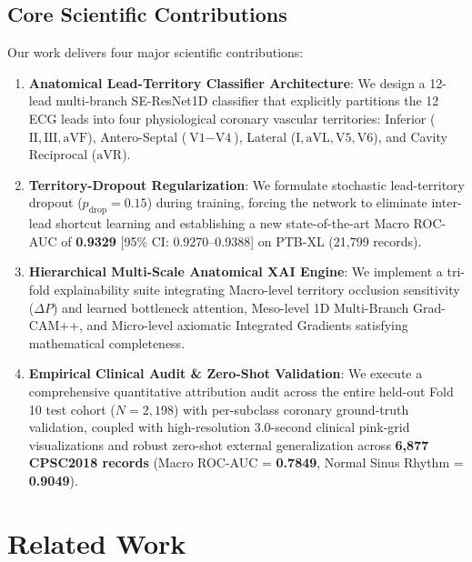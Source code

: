 \documentclass[5p,twocolumn,10pt]{elsarticle}
\begin{document}
\subsection{Core Scientific Contributions}
Our work delivers four major scientific contributions:
\begin{enumerate}
    \item \textbf{Anatomical Lead-Territory Classifier Architecture}: We design a 12-lead multi-branch SE-ResNet1D classifier that explicitly partitions the 12 ECG leads into four physiological coronary vascular territories: Inferior ($\text{II}, \text{III}, \text{aVF}$), Antero-Septal ($\text{V1}-\text{V4}$), Lateral ($\text{I}, \text{aVL}, \text{V5}, \text{V6}$), and Cavity Reciprocal ($\text{aVR}$).
    \item \textbf{Territory-Dropout Regularization}: We formulate stochastic lead-territory dropout ($p_{\text{drop}} = 0.15$) during training, forcing the network to eliminate inter-lead shortcut learning and establishing a new state-of-the-art Macro ROC-AUC of \textbf{0.9329} [95\% CI: 0.9270--0.9388] on PTB-XL (21,799 records).
    \item \textbf{Hierarchical Multi-Scale Anatomical XAI Engine}: We implement a tri-fold explainability suite integrating Macro-level territory occlusion sensitivity ($\Delta P$) and learned bottleneck attention, Meso-level 1D Multi-Branch Grad-CAM++, and Micro-level axiomatic Integrated Gradients satisfying mathematical completeness.
    \item \textbf{Empirical Clinical Audit \& Zero-Shot Validation}: We execute a comprehensive quantitative attribution audit across the entire held-out Fold 10 test cohort ($N=2,198$) with per-subclass coronary ground-truth validation, coupled with high-resolution 3.0-second clinical pink-grid visualizations and robust zero-shot external generalization across \textbf{6,877 CPSC2018 records} (Macro ROC-AUC = \textbf{0.7849}, Normal Sinus Rhythm = \textbf{0.9049}).
\end{enumerate}


\section{Related Work}
\label{sec:related}
\end{document}
